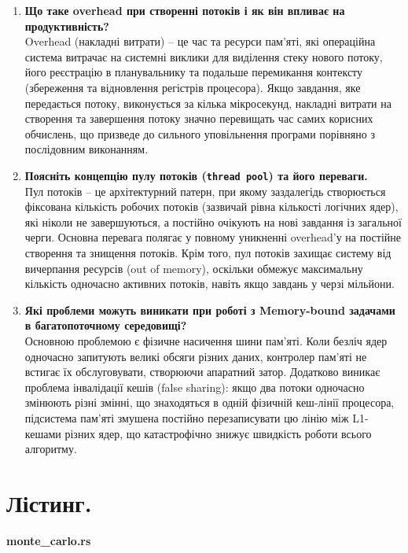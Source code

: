 \documentclass[14pt, a4paper]{extreport}
\begin{document}
\begin{enumerate}
		\item \textbf{Що таке overhead при створенні потоків і як він впливає на продуктивність?} \\ Overhead (накладні витрати) -- це час та ресурси пам'яті, які операційна система витрачає на системні виклики для виділення стеку нового потоку, його реєстрацію в планувальнику та подальше перемикання контексту (збереження та відновлення регістрів процесора). Якщо завдання, яке передається потоку, виконується за кілька мікросекунд, накладні витрати на створення та завершення потоку значно перевищать час самих корисних обчислень, що призведе до сильного уповільнення програми порівняно з послідовним виконанням.
		
		\item \textbf{Поясніть концепцію пулу потоків (\texttt{thread pool}) та його переваги.} \\ Пул потоків -- це архітектурний патерн, при якому заздалегідь створюється фіксована кількість робочих потоків (зазвичай рівна кількості логічних ядер), які ніколи не завершуються, а постійно очікують на нові завдання із загальної черги. Основна перевага полягає у повному уникненні overhead'у на постійне створення та знищення потоків. Крім того, пул потоків захищає систему від вичерпання ресурсів (out of memory), оскільки обмежує максимальну кількість одночасно активних потоків, навіть якщо завдань у черзі мільйони. 
		
		\item \textbf{Які проблеми можуть виникати при роботі з Memory-bound задачами в багатопоточному середовищі?} \\ Основною проблемою є фізичне насичення шини пам'яті. Коли безліч ядер одночасно запитують великі обсяги різних даних, контролер пам'яті не встигає їх обслуговувати, створюючи апаратний затор. Додатково виникає проблема інвалідації кешів (false sharing): якщо два потоки одночасно змінюють різні змінні, що знаходяться в одній фізичній кеш-лінії процесора, підсистема пам'яті змушена постійно перезаписувати цю лінію між L1-кешами різних ядер, що катастрофічно знижує швидкість роботи всього алгоритму.
	\end{enumerate}
	
	\pagebreak
	
	\section*{Лістинг.}
	
	\textbf{monte\_carlo.rs}
	
\end{document}
